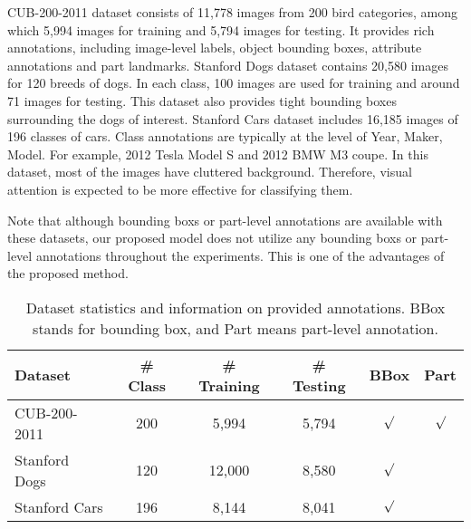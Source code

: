 \documentclass[journal]{IEEEtran}
\begin{document}
CUB-200-2011 dataset consists of 11,778 images from 200 bird categories, among which 5,994 images for training and 5,794 images for testing. It provides rich annotations, including image-level labels, object bounding boxes, attribute annotations and part landmarks.
Stanford Dogs dataset contains 20,580 images for 120 breeds of dogs. In each class, 100 images are used for training and around 71 images for testing. This dataset also provides tight bounding boxes surrounding the dogs of interest.
Stanford Cars dataset includes 16,185 images of 196 classes of cars. Class annotations are typically at the level of Year, Maker, Model. For example, 2012 Tesla Model S and 2012 BMW M3 coupe. In this dataset, most of the images have cluttered background. Therefore, visual attention is expected to be more effective for classifying them.

Note that although  bounding boxs or part-level annotations are available with these datasets,  our proposed model does not utilize any bounding boxs or part-level annotations throughout the experiments. This is one of the advantages of the proposed method.

\begin{table}[tp]
  \centering
  \caption{Dataset statistics and information on provided annotations. BBox stands for  bounding box, and Part  means  part-level annotation.}
  \vspace{-0.1in}  
  \label{tab:datasets}
  \begin{tabular}{l c c c c c}
    \hline\hline
    Dataset & \# Class & \# Training & \# Testing & BBox & Part \\
    \hline
    CUB-200-2011 \cite{CUB_200_2011}& 200 & 5,994 & 5,794 & $\surd$ & $\surd$\\
    Stanford Dogs \cite{standford_dogs}& 120 & 12,000 & 8,580 & $\surd$ & \\
    Stanford Cars \cite{standford_cars}& 196 & 8,144 & 8,041 & $\surd$ & \\
   \hline\hline
  \end{tabular}
\vspace{-0.2in}
\end{table}

\end{document}
